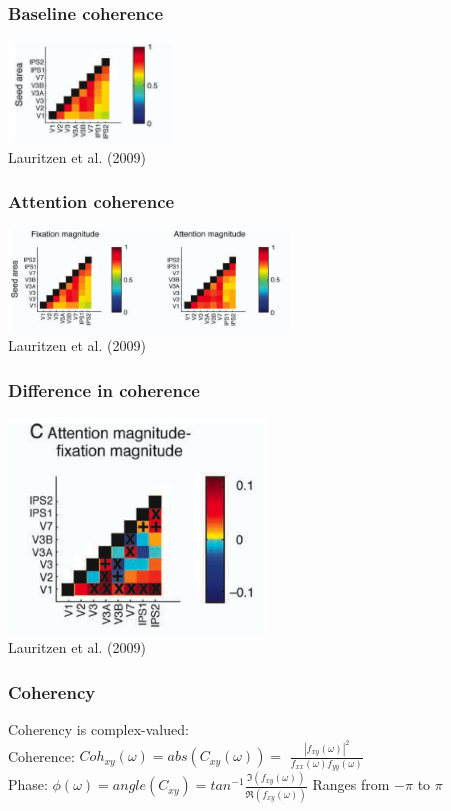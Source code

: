 \documentclass{beamer}
\begin{document}
\begin{frame}
\frametitle{Baseline coherence}
\includegraphics[height=2.7cm]{figures/lauritzen3}
\\
\hfill 
Lauritzen et al. (2009)
\end{frame}

\begin{frame}
\frametitle{Attention coherence}
\includegraphics[height=2.7cm]{figures/lauritzen4}
\\
\hfill 
Lauritzen et al. (2009)
\end{frame}

\begin{frame}
\frametitle{Difference in coherence}
\includegraphics[height=5.7cm]{figures/lauritzen5}
\\
\hfill 
Lauritzen et al. (2009)
\end{frame}

\begin{frame}
\frametitle{Coherency}
Coherency is complex-valued:
\\
\vfill
Coherence: $Coh_{xy} (\omega) = abs(C_{xy}(\omega)) = $
$\frac{|f_{xy}(\omega)|^2}{f_{xx}(\omega)f_{yy}(\omega)}$
\\
\pause
\vfill
Phase: $\phi(\omega)= angle(C_{xy}) =
tan^{-1}\frac{\Im(f_{xy}(\omega))}{\Re(f_{xy}(\omega))}$
\vfill
\pause
Ranges from $-\pi$ to $\pi$
\end{frame}
\end{document}
